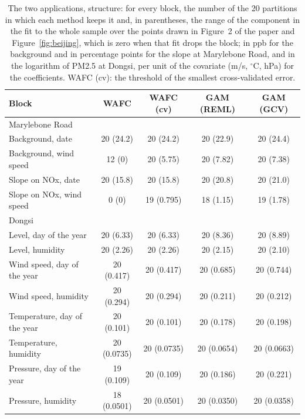 \begin{table}[tp]
\caption{The two applications, structure: for every block, the number of the
20 partitions in which each method keeps it and, in parentheses, the range of
the component in the fit to the whole sample over the points drawn in
Figure~2 of the paper and Figure~\ref{fig:beijing}, which is zero when that
fit drops the block; in ppb for the background and in percentage points for
the slope at Marylebone Road, and in the logarithm of PM2.5 at Dongsi, per
unit of the covariate (m/s, $^{\circ}$C, hPa) for the coefficients. WAFC
(cv): the threshold of the smallest cross-validated error.}
\label{tab:app-structure}
\centering
\small
\setlength{\tabcolsep}{5pt}
\begin{tabular}{lcccc}
\hline
Block & WAFC & WAFC (cv) & GAM (REML) & GAM (GCV) \\
\hline
\multicolumn{5}{l}{Marylebone Road} \\
Background, date & 20 (24.2) & 20 (24.2) & 20 (22.9) & 20 (24.4) \\
Background, wind speed & 12 (0) & 20 (5.75) & 20 (7.82) & 20 (7.38) \\
Slope on NOx, date & 20 (15.8) & 20 (15.8) & 20 (20.8) & 20 (21.0) \\
Slope on NOx, wind speed & 0 (0) & 19 (0.795) & 18 (1.15) & 19 (1.78) \\
\hline
\multicolumn{5}{l}{Dongsi} \\
Level, day of the year & 20 (6.33) & 20 (6.33) & 20 (8.36) & 20 (8.89) \\
Level, humidity & 20 (2.26) & 20 (2.26) & 20 (2.15) & 20 (2.10) \\
Wind speed, day of the year & 20 (0.417) & 20 (0.417) & 20 (0.685) & 20 (0.744) \\
Wind speed, humidity & 20 (0.294) & 20 (0.294) & 20 (0.211) & 20 (0.212) \\
Temperature, day of the year & 20 (0.101) & 20 (0.101) & 20 (0.178) & 20 (0.198) \\
Temperature, humidity & 20 (0.0735) & 20 (0.0735) & 20 (0.0654) & 20 (0.0663) \\
Pressure, day of the year & 19 (0.109) & 20 (0.109) & 20 (0.186) & 20 (0.221) \\
Pressure, humidity & 18 (0.0501) & 20 (0.0501) & 20 (0.0350) & 20 (0.0358) \\
\hline
\end{tabular}
\end{table}
